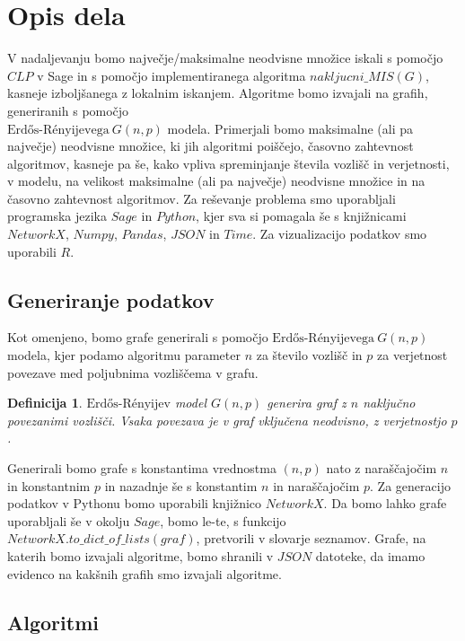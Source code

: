 \documentclass[a4paper, 12pt]{article}
\newtheorem{definicija}{Definicija}
\begin{document}
\newpage

\section{Opis dela}
V nadaljevanju bomo največje/maksimalne neodvisne množice iskali s pomočjo $CLP$ v Sage in s pomočjo implementiranega algoritma $nakljucni\_MIS(G)$,  kasneje izboljšanega z lokalnim
iskanjem. Algoritme bomo izvajali na grafih, generiranih s pomočjo \\
$\text{Erdős-Rényijevega}\ G(n,p)$ modela. Primerjali bomo maksimalne (ali pa največje) neodvisne množice, ki jih algoritmi poiščejo,
časovno zahtevnost algoritmov, kasneje pa še, kako vpliva spreminjanje števila vozlišč in verjetnosti, v modelu, na velikost maksimalne (ali pa največje) neodvisne množice in na
časovno zahtevnost algoritmov. Za reševanje problema smo uporabljali programska jezika $Sage$ in $Python$, kjer sva si pomagala še s knjižnicami $NetworkX$, $Numpy$, $Pandas$, $JSON$ in $Time$.
Za vizualizacijo podatkov smo uporabili $R$.

\subsection{Generiranje podatkov}
Kot omenjeno, bomo grafe generirali s pomočjo $\text{Erdős-Rényijevega}\ G(n,p)$ modela, kjer podamo algoritmu parameter $n$ za število vozlišč in $p$ za verjetnost povezave med poljubnima vozliščema v grafu.

\begin{definicija}
    $\text{Erdős-Rényijev}$ model $G(n, p)$ generira graf z $n$ naključno povezanimi vozlišči. Vsaka povezava je v graf vključena neodvisno, z verjetnostjo $p$.
\end{definicija}

\noindent Generirali bomo grafe s konstantima vrednostma $(n,p)$ nato z naraščajočim $n$ in konstantnim $p$ in nazadnje še s konstantim $n$ in naraščajočim $p$. Za generacijo podatkov v Pythonu bomo uporabili
knjižnico $NetworkX$. Da bomo lahko grafe uporabljali še v okolju $Sage$, bomo le-te, s funkcijo $NetworkX.to\_dict\_of\_lists(graf)$, pretvorili v slovarje seznamov.
Grafe, na katerih bomo izvajali algoritme, bomo shranili v $JSON$ datoteke, da imamo evidenco na kakšnih grafih smo izvajali algoritme.


\subsection{Algoritmi}
\end{document}

